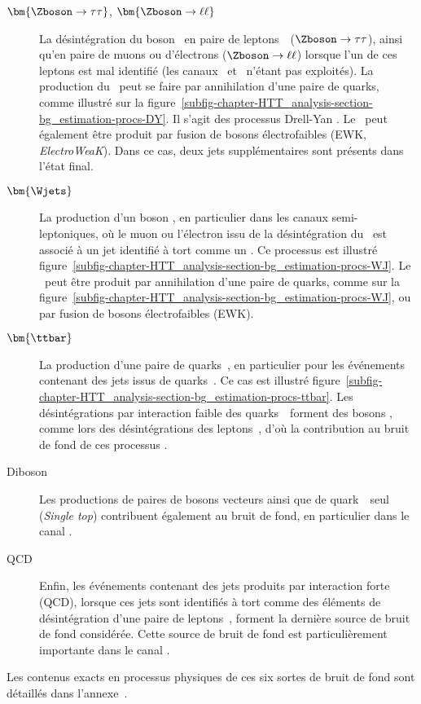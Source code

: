 \begin{description}
\item[$\bm{\Zboson\to\tau\tau}$, $\bm{\Zboson\to\ell\ell}$] La désintégration du boson \Zboson\ en paire de leptons~\tau\ ($\Zboson\to\tau\tau$),
ainsi qu'en paire de muons ou d'électrons ($\Zboson\to\ell\ell$) lorsque l'un de ces leptons est mal identifié (les canaux \mu\mu\ et \ele\ele\ n'étant pas exploités).
La production du \Zboson\ peut se faire par annihilation d'une paire de quarks, comme illustré sur la figure~\ref{subfig-chapter-HTT_analysis-section-bg_estimation-procs-DY}.
Il s'agit des processus \og Drell-Yan \fg.
Le \Zboson\ peut également être produit par fusion de bosons électrofaibles (EWK, \emph{ElectroWeaK}).
Dans ce cas, deux jets supplémentaires sont présents dans l'état final.
\item[$\bm{\Wjets}$] La production d'un boson \Wboson, en particulier dans les canaux semi-leptoniques, où le muon ou l'électron issu de la désintégration du \Wboson\ est associé à un jet identifié à tort comme un \tauh.
Ce processus est illustré figure~\ref{subfig-chapter-HTT_analysis-section-bg_estimation-procs-WJ}.
Le \Wboson\ peut être produit par annihilation d'une paire de quarks, comme sur la figure~\ref{subfig-chapter-HTT_analysis-section-bg_estimation-procs-WJ}, ou par fusion de bosons électrofaibles (EWK).
\item[$\bm{\ttbar}$] La production d'une paire de quarks~\quarkt, en particulier pour les événements contenant des jets issus de quarks~\quarkb.
Ce cas est illustré figure~\ref{subfig-chapter-HTT_analysis-section-bg_estimation-procs-ttbar}.
Les désintégrations par interaction faible des quarks~\quarkt\ forment des bosons \Wboson, comme lors des désintégrations des leptons~\tau, d'où la contribution au bruit de fond de ces processus \ttbar.
\item[Diboson] Les productions de paires de bosons vecteurs ainsi que de quark~\quarkt\ seul (\emph{Single top}) contribuent également au bruit de fond, en particulier dans le canal \ele\mu.
\item[QCD] Enfin, les événements contenant des jets produits par interaction forte (QCD), lorsque ces jets sont identifiés à tort comme des éléments de désintégration d'une paire de leptons~\tau, forment la dernière source de bruit de fond considérée.
Cette source de bruit de fond est particulièrement importante dans le canal \tauh\tauh.
\end{description}
Les contenus exacts en processus physiques de ces six sortes de bruit de fond sont détaillés dans l'annexe~.
